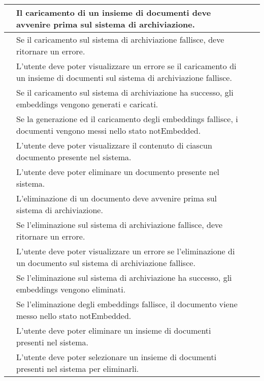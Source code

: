 \documentclass[10pt, a4paper]{article}
\begin{document}
\begin{xltabular}{\textwidth}{|c|X|c|c}
\hline {} & Il caricamento di un insieme di documenti deve avvenire prima sul sistema di archiviazione. &  \\
\hline {} & Se il caricamento sul sistema di archiviazione fallisce, deve ritornare un errore. &  \\
\hline {} & L'utente deve poter visualizzare un errore se il caricamento di un insieme di documenti sul sistema di archiviazione fallisce. &  \\
\hline {} & Se il caricamento sul sistema di archiviazione ha successo, gli embeddings vengono generati e caricati. &  \\
\hline {} & Se la generazione ed il caricamento degli embeddings fallisce, i documenti vengono messi nello stato notEmbedded. &  \\


\hline {} & L'utente deve poter visualizzare il contenuto di ciascun documento presente nel sistema. &  \\
\hline {} & L'utente deve poter eliminare un documento presente nel sistema. &   \\

\hline {} & L'eliminazione di un documento deve avvenire prima sul sistema di archiviazione. &  \\
\hline {} & Se l'eliminazione sul sistema di archiviazione fallisce, deve ritornare un errore. &  \\
\hline {} & L'utente deve poter visualizzare un errore se l'eliminazione di un documento sul sistema di archiviazione fallisce. &  \\
\hline {} & Se l'eliminazione sul sistema di archiviazione ha successo, gli embeddings vengono eliminati. &  \\
\hline {} & Se l'eliminazione degli embeddings fallisce, il documento viene messo nello stato notEmbedded. &  \\

\hline {} & L'utente deve poter eliminare un insieme di documenti presenti nel sistema. &   \\
\hline {} & L'utente deve poter selezionare un insieme di documenti presenti nel sistema per eliminarli. &  \\


\end{xltabular}
\end{document}
